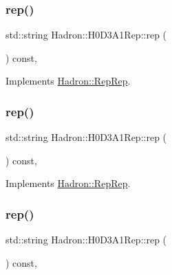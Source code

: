 \subsubsection{\texorpdfstring{rep()}{rep()}\hspace{0.1cm}{\footnotesize\ttfamily [2/5]}}
{\footnotesize\ttfamily std\+::string Hadron\+::\+H0\+D3\+A1\+Rep\+::rep (\begin{DoxyParamCaption}{ }\end{DoxyParamCaption}) const\hspace{0.3cm}{\ttfamily [inline]}, {\ttfamily [virtual]}}



Implements \mbox{\hyperlink{structHadron_1_1RepRep_ab3213025f6de249f7095892109575fde}{Hadron\+::\+Rep\+Rep}}.

\mbox{\label{structHadron_1_1H0D3A1Rep_a5dae40cb41876bf42a5c9f65ffd5f222}} 
\subsubsection{\texorpdfstring{rep()}{rep()}\hspace{0.1cm}{\footnotesize\ttfamily [3/5]}}
{\footnotesize\ttfamily std\+::string Hadron\+::\+H0\+D3\+A1\+Rep\+::rep (\begin{DoxyParamCaption}{ }\end{DoxyParamCaption}) const\hspace{0.3cm}{\ttfamily [inline]}, {\ttfamily [virtual]}}



Implements \mbox{\hyperlink{structHadron_1_1RepRep_ab3213025f6de249f7095892109575fde}{Hadron\+::\+Rep\+Rep}}.

\mbox{\label{structHadron_1_1H0D3A1Rep_a5dae40cb41876bf42a5c9f65ffd5f222}} 
\subsubsection{\texorpdfstring{rep()}{rep()}\hspace{0.1cm}{\footnotesize\ttfamily [4/5]}}
{\footnotesize\ttfamily std\+::string Hadron\+::\+H0\+D3\+A1\+Rep\+::rep (\begin{DoxyParamCaption}{ }\end{DoxyParamCaption}) const\hspace{0.3cm}{\ttfamily [inline]}, {\ttfamily [virtual]}}



